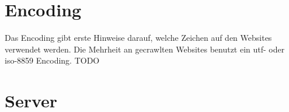 \documentclass[a4paper,12pt,titlepage=false]{scrreprt}
\begin{document}
\section{Encoding}
\vspace{.1cm}

Das Encoding gibt erste Hinweise darauf, welche Zeichen auf den Websites verwendet werden. Die Mehrheit an gecrawlten Websites benutzt ein utf- oder iso-8859 Encoding. TODO

\section{Server}
\vspace{.1cm}
\end{document}

